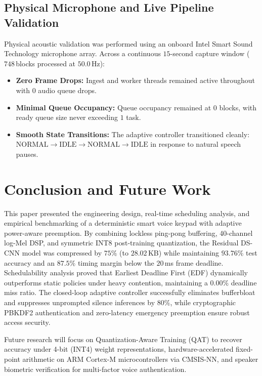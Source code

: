 \documentclass[10pt,twocolumn,letterpaper]{article}
\begin{document}
\subsection{Physical Microphone and Live Pipeline Validation}

Physical acoustic validation was performed using an onboard Intel Smart Sound Technology microphone array. Across a continuous $15$-second capture window ($748$\,blocks processed at $50.0$\,Hz):
\begin{itemize}
    \item \textbf{Zero Frame Drops:} Ingest and worker threads remained active throughout with $0$ audio queue drops.
    \item \textbf{Minimal Queue Occupancy:} Queue occupancy remained at $0$ blocks, with ready queue size never exceeding $1$ task.
    \item \textbf{Smooth State Transitions:} The adaptive controller transitioned cleanly: $\text{NORMAL} \rightarrow \text{IDLE} \rightarrow \text{NORMAL} \rightarrow \text{IDLE}$ in response to natural speech pauses.
\end{itemize}

\section{Conclusion and Future Work}

This paper presented the engineering design, real-time scheduling analysis, and empirical benchmarking of a deterministic smart voice keypad with adaptive power-aware preemption. By combining lockless ping-pong buffering, 40-channel log-Mel DSP, and symmetric INT8 post-training quantization, the Residual DS-CNN model was compressed by $75\%$ (to $28.02$\,KB) while maintaining $93.76\%$ test accuracy and an $87.5\%$ timing margin below the $20$\,ms frame deadline. Schedulability analysis proved that Earliest Deadline First (EDF) dynamically outperforms static policies under heavy contention, maintaining a $0.00\%$ deadline miss ratio. The closed-loop adaptive controller successfully eliminates bufferbloat and suppresses unprompted silence inferences by $80\%$, while cryptographic PBKDF2 authentication and zero-latency emergency preemption ensure robust access security.

Future research will focus on Quantization-Aware Training (QAT) to recover accuracy under 4-bit (INT4) weight representations, hardware-accelerated fixed-point arithmetic on ARM Cortex-M microcontrollers via CMSIS-NN, and speaker biometric verification for multi-factor voice authentication.
\end{document}
